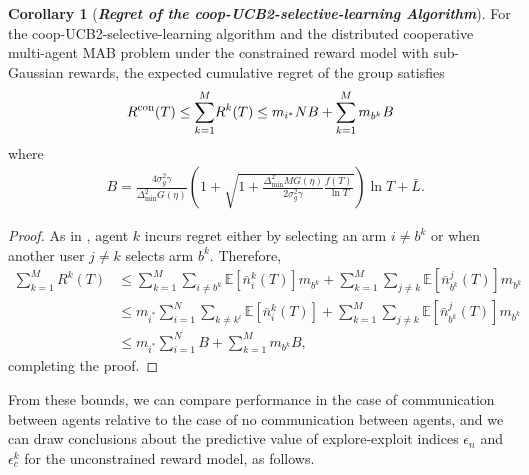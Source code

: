 \documentclass[final,5p,times,twocolumn]{elsarticle}
\theoremstyle{definition}
\newtheorem{corollary}{Corollary}
\newcommand{\supscr}[2]{#1^{\textup{#2}}}
\newcommand{\lnn}[1]{%
	\ln  \left(#1\right)%
}
\newcommand\bit[1]{\textit{\textbf{#1}}}
\begin{document}
\begin{corollary}[\bit{Regret of the coop-UCB2-selective-learning Algorithm}] \label{thm:RegretCollisions}
For the coop-UCB2-selective-learning algorithm and the distributed cooperative multi-agent MAB problem under the constrained reward model with sub-Gaussian rewards, the expected cumulative regret of the group satisfies
	\begin{equation}
	\supscr{R}{con}(T) \le 	\sum_{k=1}^M \! R^k(T)  \leq  m_{i^*} N B + \sum_{k=1}^M  m_{b^k}  B \nonumber
	\end{equation}
		where 
	\begin{align}
		&B  \! =\! \frac{4 \sigma_g^2 \gamma  }{\Delta_{\min}^2 G(\eta)}  \left( 1 + \sqrt{1  +  \frac{\Delta_{\min}^2 MG(\eta)}{2 \sigma_g^2 \gamma} \frac{f(T)}{\ln T}} \right)  \ln T + \bar L.
	\end{align}
\end{corollary}

\begin{proof}
	As in \cite{gai2014distributed}, agent $k$ incurs regret either by selecting an arm $i \neq b^k$ or when another user $j\neq k$ selects arm $b^k$.  Therefore, 
	\begin{align}
		\sum_{k=1}^M \! R^k(T)  & 
		 \leq \! \sum_{k=1}^M \sum_{i \neq b^k} \! \mathbb{E} \left [ \bar n_i^k(T) \right ] \! m_{b^k} + \sum_{k=1}^M \sum_{j \neq k} \mathbb{E} \! \left [ \bar n_{b^k}^j(T) \right ] \! m_{b^k} \nonumber \\
		& \leq \! m_{i^*} \sum_{i=1}^N \sum_{k \neq k^i} \! \mathbb{E} \left [ \bar n_i^k(T) \right ]  + \sum_{k=1}^M \sum_{j \neq k} \mathbb{E} \! \left [ \bar n_{b^k}^j(T) \right ] \! m_{b^k} \nonumber \\
		& \leq \! m_{i^*} \sum_{i=1}^N B + \sum_{k=1}^M  m_{b^k}  B, \nonumber
	\end{align}
	completing the proof.
\end{proof}

From these bounds, we can compare performance in the case of communication between agents relative to the case of no communication between agents, and we can draw conclusions about the predictive value of explore-exploit indices $\epsilon_n$ and $\epsilon_c^k$ for the unconstrained reward model, as follows.
\end{document}
